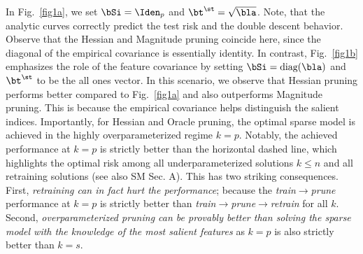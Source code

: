 In Fig.~\ref{fig1a}, we set $\bSi=\Iden_p$ and $\bt^\st=\sqrt{\bla}$. Note, that the analytic curves correctly predict the test risk and the double descent behavior. Observe that the Hessian and Magnitude pruning coincide here, since the diagonal of the empirical covariance is essentially identity. In contrast, Fig.~\ref{fig1b} emphasizes the role of the feature covariance by setting $\bSi=\text{diag}(\bla)$ and $\bt^\st$ to be the all ones vector. In this scenario, we observe that Hessian pruning performs better compared to Fig.~\ref{fig1a} and also outperforms Magnitude pruning. This is because the empirical covariance helps distinguish the salient indices. Importantly, for Hessian and Oracle pruning, the optimal sparse model is achieved in the highly overparameterized regime $k=p$. Notably, the achieved performance at $k=p$ is strictly better than the horizontal dashed line,  which highlights the optimal risk among all underparameterized solutions $k\leq n$ and all retraining solutions (see also SM Sec. A). This has two striking consequences. First, {\em{retraining can in fact hurt the performance}}; because the {\em{train$\rightarrow$prune}} performance at $k=p$ is strictly better than  {\em{train$\rightarrow$prune$\rightarrow$retrain}} for all $k$. Second, {\em{overparameterized pruning can be provably better than solving the sparse model with the knowledge of the most salient features}} as $k=p$ is also strictly better than $k=s$.

